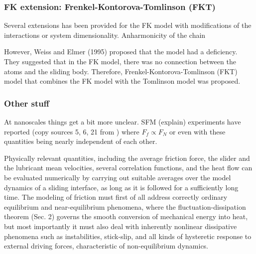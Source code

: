 \subsubsection{FK extension: Frenkel-Kontorova-Tomlinson (FKT)}

Several extensions has been provided for the FK model with modifications of the
interactions or system dimensionality. Anharmonicity of the chain 


However, Weiss and Elmer (1995) proposed that the model had a deficiency. They suggested that in the FK model, there was no connection between the atoms and the sliding body. Therefore, Frenkel-Kontorova-Tomlinson (FKT) model that combines the FK model with the Tomlinson model was proposed. \cite{kim_nano-scale_2009}







\subsubsection{Other stuff}


At nanoscales things get a bit more unclear. SFM (explain) experiments have
reported (copy sources 5, 6, 21 from \cite{mo_friction_2009}) where $F_f \propto
F_N$ or even with these quantities being nearly independent of each other.


Physically relevant quantities, including the average friction force, the slider and the lubricant mean velocities, several correlation functions, and the heat flow can be evaluated numerically by carrying out suitable averages over the model dynamics of a sliding interface, as long as it is followed for a sufficiently long time. The modeling of friction must first of all address correctly ordinary equilibrium and near-equilibrium phenomena, where the fluctuation-dissipation theorem (Sec. 2) governs the smooth conversion of mechanical energy into heat, but most importantly it must also deal with inherently nonlinear dissipative phenomena such as instabilities, stick-slip, and all kinds of hysteretic response to external driving forces, characteristic of non-equilibrium dynamics. 
\cite{Manini_2016}





